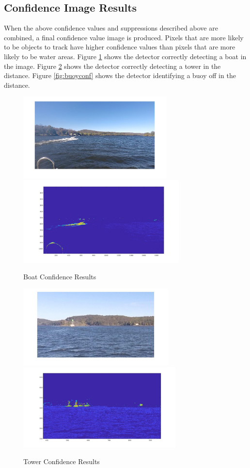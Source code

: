 \documentclass{article}
\begin{document}
\subsection{Confidence Image Results}
When the above confidence values and suppressions described above are combined,
a final confidence value image is produced. Pixels that are more likely to be
objects to track have higher confidence values than pixels that are more likely
to be water areas. Figure \ref{fig:boatconf} shows the detector correctly
detecting a boat in the image.  Figure \ref{fig:towerconf} shows the detector
correctly detecting a tower in the distance.  Figure \ref{fig:buoyconf} shows
the detector identifying a buoy off in the distance.

\begin{figure}[H]
\includegraphics[width=7.8cm]{hsv_kmeans2_orig}
\includegraphics[width=8.5cm]{hsv_kmeans2_suppressed}
\centering
\caption{Boat Confidence Results}
\label{fig:boatconf}
\end{figure}

\begin{figure}[H]
\includegraphics[width=7.9cm]{hsv_kmeans2_tower}
\includegraphics[width=8.3cm]{hsv_kmeans2_tower_result}
\centering
\caption{Tower Confidence Results}
\label{fig:towerconf}
\end{figure}
\end{document}
